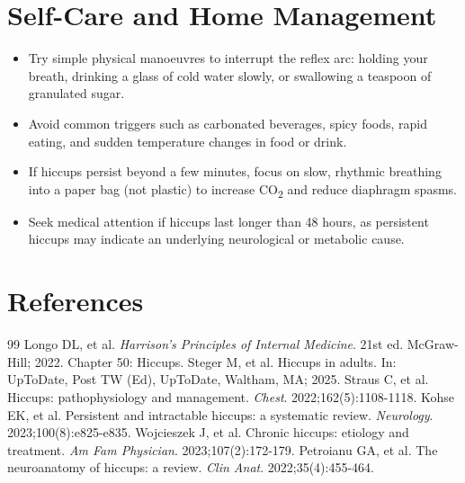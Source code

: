 \section*{Self-Care and Home Management}
\begin{itemize}
  \item Try simple physical manoeuvres to interrupt the reflex arc: holding your breath, drinking a glass of cold water slowly, or swallowing a teaspoon of granulated sugar.
  \item Avoid common triggers such as carbonated beverages, spicy foods, rapid eating, and sudden temperature changes in food or drink.
  \item If hiccups persist beyond a few minutes, focus on slow, rhythmic breathing into a paper bag (not plastic) to increase CO\textsubscript{2} and reduce diaphragm spasms.
  \item Seek medical attention if hiccups last longer than 48 hours, as persistent hiccups may indicate an underlying neurological or metabolic cause.
\end{itemize}

\section*{References}

\begin{thebibliography}{99}
 Longo DL, et al. \emph{Harrison's Principles of Internal Medicine}. 21st ed. McGraw-Hill; 2022. Chapter 50: Hiccups.
 Steger M, et al. Hiccups in adults. In: UpToDate, Post TW (Ed), UpToDate, Waltham, MA; 2025.
 Straus C, et al. Hiccups: pathophysiology and management. \emph{Chest}. 2022;162(5):1108-1118.
 Kohse EK, et al. Persistent and intractable hiccups: a systematic review. \emph{Neurology}. 2023;100(8):e825-e835.
 Wojcieszek J, et al. Chronic hiccups: etiology and treatment. \emph{Am Fam Physician}. 2023;107(2):172-179.
 Petroianu GA, et al. The neuroanatomy of hiccups: a review. \emph{Clin Anat}. 2022;35(4):455-464.
\end{thebibliography}
